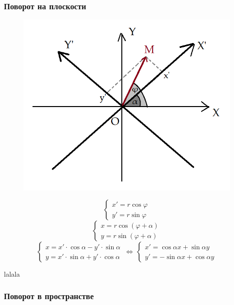 \documentclass{article}
\begin{document}
\subsubsection{Поворот на плоскости}
    \begin{figure}
        \centering
        \includegraphics[scale=0.3]{pic34.png}
    \end{figure}
    $$ \begin{cases} x'=r\cos\varphi \\y'=r\sin\varphi \end{cases}$$
    $$ \begin{cases} x=r\cos(\varphi+\alpha) \\ y=r\sin(\varphi+\alpha) \end{cases} $$
    $$ \begin{cases}x=x'\cdot\cos\alpha-y'\cdot\sin\alpha\\y=x'\cdot\sin\alpha+y'\cdot\cos\alpha\end{cases}\,\Leftrightarrow\,\begin{cases} x'=\cos\alpha x +\sin\alpha y\\y'=-\sin\alpha x+\cos\alpha y \end{cases}$$
    
    lalala
    
\subsubsection{Поворот в пространстве}
    
\end{document}
